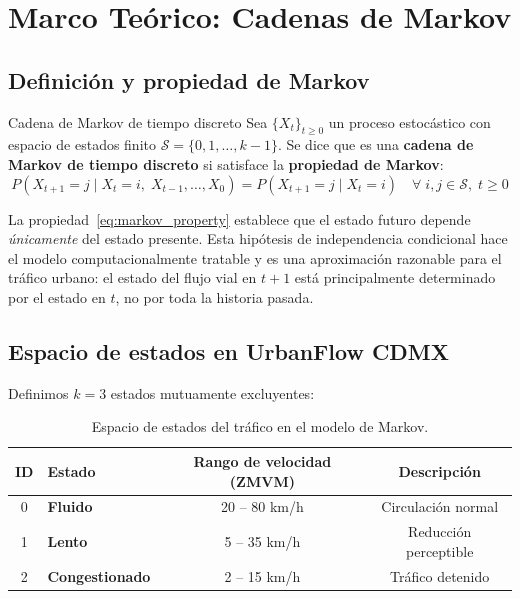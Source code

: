 \documentclass[12pt, a4paper]{article}
\theoremstyle{definition}
\begin{document}
\section{Marco Teórico: Cadenas de Markov}

\subsection{Definición y propiedad de Markov}

\begin{cajadefinicion}{Cadena de Markov de tiempo discreto}
Sea $\{X_t\}_{t \geq 0}$ un proceso estocástico con espacio de estados finito
$\mathcal{S} = \{0, 1, \ldots, k-1\}$. Se dice que es una
\textbf{cadena de Markov de tiempo discreto} si satisface la
\textbf{propiedad de Markov}:
\begin{equation}
    P(X_{t+1} = j \mid X_t = i,\; X_{t-1},\ldots, X_0)
    = P(X_{t+1} = j \mid X_t = i)
    \quad \forall\; i, j \in \mathcal{S},\; t \geq 0
    \label{eq:markov_property}
\end{equation}
\end{cajadefinicion}

La propiedad~\eqref{eq:markov_property} establece que el estado futuro depende
\emph{únicamente} del estado presente. Esta hipótesis de independencia condicional
hace el modelo computacionalmente tratable y es una aproximación razonable para
el tráfico urbano: el estado del flujo vial en $t+1$ está principalmente
determinado por el estado en $t$, no por toda la historia pasada.

\subsection{Espacio de estados en UrbanFlow CDMX}

Definimos $k=3$ estados mutuamente excluyentes:

\begin{table}[h!]
\centering
\renewcommand{\arraystretch}{1.3}
\begin{tabular}{clcc}
\toprule
\textbf{ID} & \textbf{Estado} &
\textbf{Rango de velocidad (ZMVM)} & \textbf{Descripción} \\
\midrule
0 & \textcolor{fluido}{\textbf{Fluido}}        & 20 – 80 km/h & Circulación normal \\
1 & \textcolor{lento}{\textbf{Lento}}          & 5 – 35 km/h  & Reducción perceptible \\
2 & \textcolor{congestionado}{\textbf{Congestionado}} & 2 – 15 km/h & Tráfico detenido \\
\bottomrule
\end{tabular}
\caption{Espacio de estados del tráfico en el modelo de Markov.}
\end{table}
\end{document}
